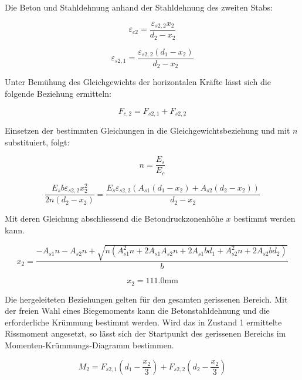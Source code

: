 \documentclass[
  12pt,
  letterpaper,
  egregdoesnotlikesansseriftitles]{scrreprt}
\begin{document}
Die Beton und Stahldehnung anhand der Stahldehnung des zweiten Stabs:

\begin{equation}\varepsilon_{c2} = \frac{\varepsilon_{s2,2} x_{2}}{d_{2} - x_{2}}\end{equation}

\begin{equation}\varepsilon_{s2,1} = \frac{\varepsilon_{s2,2} \left(d_{1} - x_{2}\right)}{d_{2} - x_{2}}\end{equation}

Unter Bemühung des Gleichgewichts der horizontalen Kräfte lässt sich die
folgende Beziehung ermitteln:

\begin{equation}F_{c,2} = F_{s2,1} + F_{s2,2}\end{equation}

Einsetzen der bestimmten Gleichungen in die Gleichgewichtsbeziehung und
mit \(n\) substituiert, folgt:

\begin{equation}n = \frac{E_{s}}{E_{c}}\end{equation}

\begin{equation}\frac{E_{s} b \varepsilon_{s2,2} x_{2}^{2}}{2 n \left(d_{2} - x_{2}\right)} = \frac{E_{s} \varepsilon_{s2,2} \left(A_{s 1} \left(d_{1} - x_{2}\right) + A_{s 2} \left(d_{2} - x_{2}\right)\right)}{d_{2} - x_{2}}\end{equation}

Mit deren Gleichung abschliessend die Betondruckzonenhöhe \(x\) bestimmt
werden kann.

\begin{equation}x_{2} = \frac{- A_{s 1} n - A_{s 2} n + \sqrt{n \left(A_{s 1}^{2} n + 2 A_{s 1} A_{s 2} n + 2 A_{s 1} b d_{1} + A_{s 2}^{2} n + 2 A_{s 2} b d_{2}\right)}}{b}\end{equation}

\begin{equation}x_{2} = 111.0 \text{mm}\end{equation}

Die hergeleiteten Beziehungen gelten für den gesamten gerissenen
Bereich. Mit der freien Wahl eines Biegemoments kann die
Betonstahldehnung und die erforderliche Krümmung bestimmt werden. Wird
das in Zustand 1 ermittelte Rissmoment angesetzt, so lässt sich der
Startpunkt des gerissenen Bereichs im Momenten-Krümmungs-Diagramm
bestimmen.

\begin{equation}M_{2} = F_{s2,1} \left(d_{1} - \frac{x_{2}}{3}\right) + F_{s2,2} \left(d_{2} - \frac{x_{2}}{3}\right)\end{equation}
\end{document}
